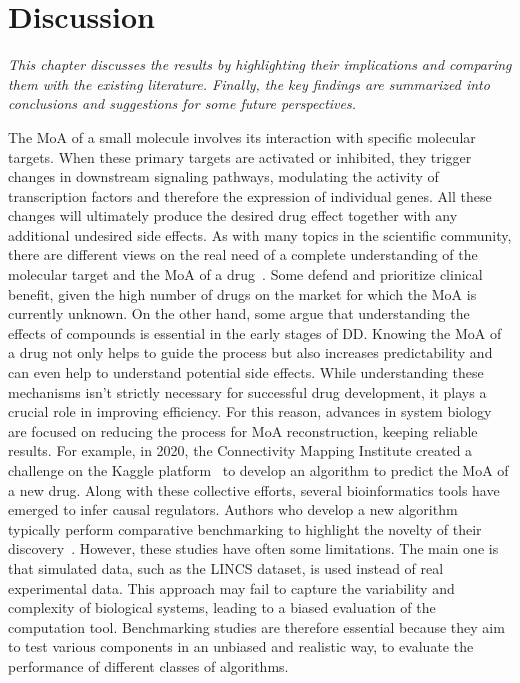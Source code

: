 
%


\chapter{Discussion}
\label{cha:discussion}


\textit{This chapter discusses the results by highlighting their implications and comparing them with the existing literature. Finally, the key findings are summarized into conclusions and suggestions for some future perspectives.}

The MoA of a small molecule involves its interaction with specific molecular targets. When these primary targets are activated or inhibited, they trigger changes in downstream signaling pathways, modulating the activity of transcription factors and therefore the expression of individual genes. All these changes will ultimately produce the desired drug effect together with any additional undesired side effects. As with many topics in the scientific community, there are different views on the real need of a complete understanding of the molecular target and the MoA of a drug~\cite{RN112}. Some defend and prioritize clinical benefit, given the high number of drugs on the market for which the MoA is currently unknown. On the other hand, some argue that understanding the effects of compounds is essential in the early stages of DD. Knowing the MoA of a drug not only helps to guide the process but also increases predictability and can even help to understand potential side effects. While understanding these mechanisms isn't strictly necessary for successful drug development, it plays a crucial role in improving efficiency. For this reason, advances in system biology are focused on reducing the process for MoA reconstruction, keeping reliable results. For example, in 2020, the Connectivity Mapping Institute created a challenge on the Kaggle platform~\cite{RN162} to develop an algorithm to predict the MoA of a new drug. Along with these collective efforts, several bioinformatics tools have emerged to infer causal regulators. Authors who develop a new algorithm typically perform comparative benchmarking to highlight the novelty of their discovery~\cite{RN109}. However, these studies have often some limitations. The main one is that simulated data, such as the LINCS dataset, is used instead of real experimental data. This approach may fail to capture the variability and complexity of biological systems, leading to a biased evaluation of the computation tool. Benchmarking studies are therefore essential because they aim to test various components in an unbiased and realistic way, to evaluate the performance of different classes of algorithms. 

